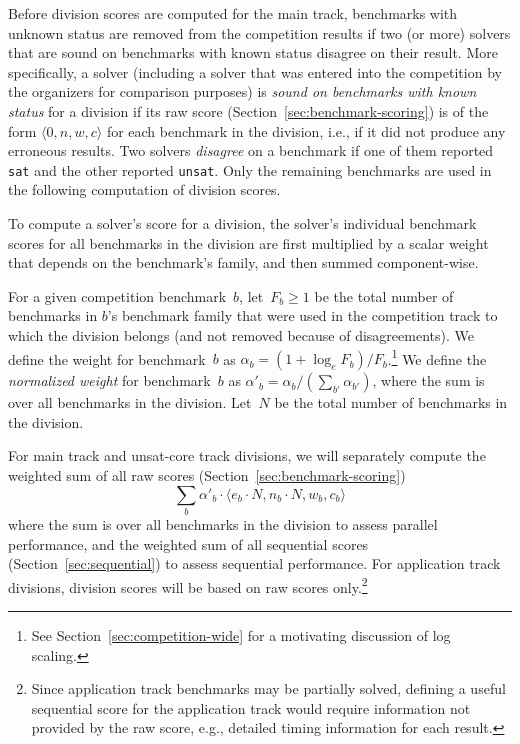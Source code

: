 \documentclass[12pt]{article}
\begin{document}
%
Before division scores are computed for the main track, benchmarks
with unknown status are removed from the competition results if two
(or more) solvers that are sound on benchmarks with known status
disagree on their result.  More specifically, a solver (including a
solver that was entered into the competition by the organizers for
comparison purposes) is \emph{sound on benchmarks with known status}
for a division if its raw score (Section~\ref{sec:benchmark-scoring})
is of the form $\langle 0, n, w, c\rangle$ for each benchmark in the
division, i.e., if it did not produce any erroneous results.  Two
solvers \emph{disagree} on a benchmark if one of them reported
\texttt{sat} and the other reported \texttt{unsat}.  Only the
remaining benchmarks are used in the following computation of division
scores.

\medskip

To compute a solver's score for a division, the solver's individual
benchmark scores for all benchmarks in the division are first
multiplied by a scalar weight that depends on the benchmark's family,
and then summed component-wise.

For a given competition benchmark~$b$, let~$F_b \geq 1$ be the total
number of benchmarks in $b$'s benchmark family that were used in the
competition track to which the division belongs (and not removed
because of disagreements).  We define the weight for benchmark~$b$ as
$\alpha_b = (1 + \log_e F_b) / F_b$.\footnote{See
  Section~\ref{sec:competition-wide} for a motivating discussion of
  log scaling.}  We define the \emph{normalized weight} for
benchmark~$b$ as $\alpha'_b = \alpha_b / (\sum_{b'} \alpha_{b'})$,
where the sum is over all benchmarks in the division.  Let~$N$ be the
total number of benchmarks in the division.

For main track and unsat-core track divisions, we will separately
compute the weighted sum of all raw scores
(Section~\ref{sec:benchmark-scoring}) $$\sum_b \alpha'_b \cdot \langle
e_b \cdot N, n_b \cdot N, w_b, c_b\rangle$$ where the sum is over all
benchmarks in the division to assess parallel performance, and the
weighted sum of all sequential scores (Section~\ref{sec:sequential})
to assess sequential performance.  For application track divisions,
division scores will be based on raw scores only.\footnote{Since
  application track benchmarks may be partially solved, defining a
  useful sequential score for the application track would require
  information not provided by the raw score, e.g., detailed timing
  information for each result.}
\end{document}
